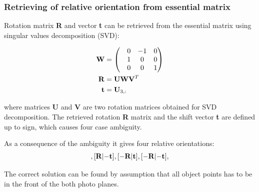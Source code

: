 \documentclass[a4paper,12pt]{article}
\newcommand{\ematr}[1]{
{\bf #1}
}
\newcommand{\evect}[1]{
{\bf #1}
}
\begin{document}
\subsubsection{Retrieving of relative orientation from essential matrix}
\label{sec:ess_eo}



Rotation matrix \ematr{R} and vector \evect{t} can be retrieved from the essential matrix using 
singular values decomposition (SVD):


\begin{equation}
\begin{split}
\ematr{W} &=
\begin{pmatrix}
& 0 & -1 & 0 \\
& 1 & 0 & 0 \\
& 0 & 0 & 1\\
\end{pmatrix} \\
 \ematr{R} &= \ematr{U}  \ematr{W} \ematr{V}^{T}\\
 \evect{t} &= \evect{U}_{3,:}
\end{split}
\end{equation}

where matrices \ematr{U} and \ematr{V} are two rotation matrices  obtained for SVD decomposition.
The retrieved rotation \ematr{R} matrix and the shift vector \evect{t} are defined up to sign,
which causes four case ambiguity. 

As a consequence of the  ambiguity it gives four relative orientations: 
\begin{equation}
[\ematr{R}|\evect{t}],
[\ematr{R}|\evect{-t}],
[\ematr{-R}|\evect{t}],
[\ematr{-R}|\evect{-t}],
\end{equation}


The correct solution can be found   by assumption that all object points has to be in the front
of the both photo planes.
\end{document}
